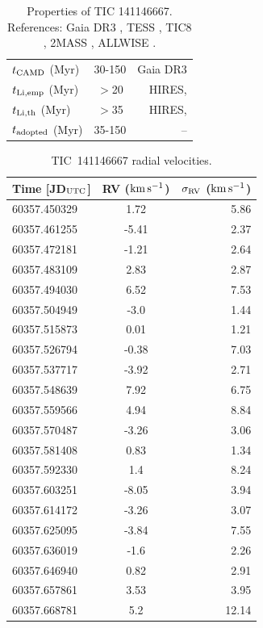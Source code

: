 \documentclass{nature3}
\newcommand{\starname}{TIC 141146667}
\newcommand{\kms}{\ensuremath{\rm km\,s^{-1}}}
\begin{document}
\begin{methods}
\begin{table}
\begin{tabular}{lcr}
    $t_{\rm CAMD}$ (Myr) & 30-150 &  Gaia DR3 \\
    $t_{\rm Li,emp}$ (Myr) & $>$20 &  HIRES, \cite{Jeffries2023} \\
    $t_{\rm Li,th}$ (Myr) & $>$35 &  HIRES, \cite{Feiden2016} \\
    $t_{\rm adopted}$ (Myr) & 35-150 &  -- \\
    \hline
    \end{tabular}
		\caption{Properties of \starname.  References:
    Gaia DR3 \cite{GaiaDR3}, TESS \cite{Ricker2015},
    TIC8 \cite{Stassun2019}, 2MASS \cite{Skrutskie2006}, ALLWISE
    \cite{Cutri2014}.}
    \label{tab:stparams}
\end{table}


\begin{table}
  \centering
  \begin{tabular}{lcr}
  \hline 
  \hline 
  Time [JD$_{\rm UTC}$] & RV (\kms) & $\sigma_{\rm RV}$ (\kms) \\
  \hline 
  60357.450329 & 1.72 & 5.86 \\
  60357.461255 & -5.41 & 2.37 \\
  60357.472181 & -1.21 & 2.64 \\
  60357.483109 & 2.83 & 2.87 \\
  60357.494030 & 6.52 & 7.53 \\
  60357.504949 & -3.0 & 1.44 \\
  60357.515873 & 0.01 & 1.21 \\
  60357.526794 & -0.38 & 7.03 \\
  60357.537717 & -3.92 & 2.71 \\
  60357.548639 & 7.92 & 6.75 \\
  60357.559566 & 4.94 & 8.84 \\
  60357.570487 & -3.26 & 3.06 \\
  60357.581408 & 0.83 & 1.34 \\
  60357.592330 & 1.4 & 8.24 \\
  60357.603251 & -8.05 & 3.94 \\
  60357.614172 & -3.26 & 3.07 \\
  60357.625095 & -3.84 & 7.55 \\
  60357.636019 & -1.6 & 2.26 \\
  60357.646940 & 0.82 & 2.91 \\
  60357.657861 & 3.53 & 3.95 \\
  60357.668781 & 5.2 & 12.14 \\
  \hline
  \end{tabular}
  \caption{TIC~141146667 radial velocities.}
  \label{tab:rv}
\end{table}



\end{methods}
\end{document}
